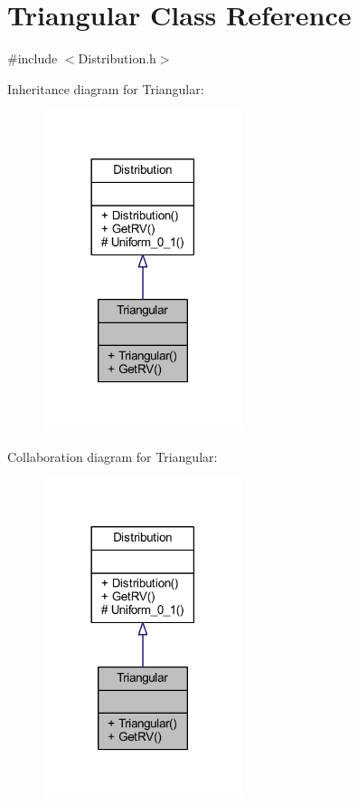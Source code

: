 \hypertarget{class_triangular}{}\section{Triangular Class Reference}
\label{class_triangular}


{\ttfamily \#include $<$Distribution.\+h$>$}



Inheritance diagram for Triangular\+:
\nopagebreak
\begin{figure}[H]
\begin{center}
\leavevmode
\includegraphics[width=165pt]{class_triangular__inherit__graph}
\end{center}
\end{figure}


Collaboration diagram for Triangular\+:
\nopagebreak
\begin{figure}[H]
\begin{center}
\leavevmode
\includegraphics[width=165pt]{class_triangular__coll__graph}
\end{center}
\end{figure}

